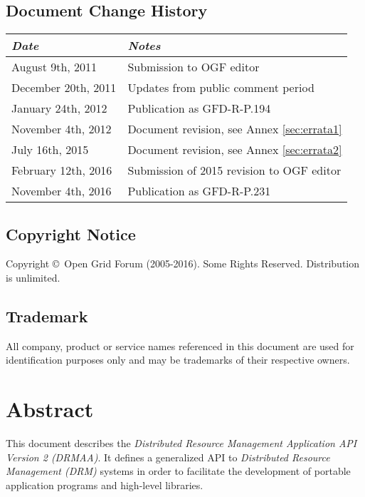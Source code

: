 \documentclass{article}
\newcommand{\copyrightyears}{2005-2016}
\begin{document}
\subsection*{Document Change History}
\vspace*{-1em}
\begin{table}[ht]
\centering
\begin{tabularx}{\textwidth}{XX}
\toprule
\emph{Date} & \emph{Notes} \\
\midrule
August    9th, 2011 & Submission to OGF editor \\
December 20th, 2011 & Updates from public comment period \\
January  24th, 2012 & Publication as GFD-R-P.194 \\
November  4th, 2012 & Document revision, see Annex \ref{sec:errata1} \\
July     16th, 2015 & Document revision, see Annex \ref{sec:errata2} \\
February 12th, 2016 & Submission of 2015 revision to OGF editor \\
November  4th, 2016 & Publication as GFD-R-P.231 \\
\bottomrule
\end{tabularx}
\end{table}
\vspace*{1em}

\subsection*{Copyright Notice}

Copyright \copyright \ Open Grid Forum (\copyrightyears).  Some Rights Reserved.
Distribution is unlimited.\\

\subsection*{Trademark}

All company, product or service names referenced in this document are used for identification purposes only and may be trademarks of their respective owners. \\

\section*{Abstract}

This document describes the \emph{Distributed Resource Management Application API Version 2 (DRMAA)}. It defines a generalized API to \emph{Distributed Resource Management (DRM)} systems in order to facilitate the development of portable application programs and high-level libraries.
\end{document}
